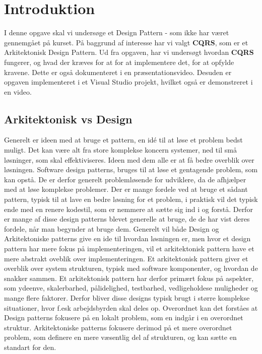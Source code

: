 \chapter{Introduktion}
I denne opgave skal vi undersøge et Design Pattern - som ikke har været gennemgået på kurset. 
På baggrund af interesse har vi valgt \textbf{CQRS}, som er et Arkitektonisk Design Pattern. Ud fra opgaven, har vi undersøgt hvordan \textbf{CQRS} fungerer, og hvad der kræves for at for at implementere det, for at opfylde kravene. Dette er også dokumenteret i en præsentationsvideo.
Desuden er opgaven implementeret i et Visual Studio projekt, hvilket også er demonstreret i en video.

\section{Arkitektonisk vs Design}
Generelt er ideen med at bruge et pattern, en idé til at løse et problem bedst muligt. Det kan være alt fra store komplekse koncern systemer, ned til små løsninger, som skal effektiviseres. Ideen med dem alle er at få bedre overblik over løsningen.
\newline
\newline
Software design patterns, bruges til at løse et gentagende problem, som kan opstå. De er derfor generelt problemløsende for udviklere, da de afhjælper med at løse komplekse problemer.
Der er mange fordele ved at bruge et sådant pattern, typisk til at lave en bedre løsning for et problem, i praktisk vil det typisk ende med en renere kodestil, som er nemmere at sætte sig ind i og forstå. Derfor er mange af disse design patterns blevet generelle at bruge, de de har vist deres fordele, når man begynder at bruge dem.
\newline
\newline
Generelt vil både Design og Arkitektoniske patterns give en ide til hvordan løsningen er, men hvor et design pattern har mere fokus på implementeringen, vil et arkitektonisk pattern have et mere abstrakt oveblik over implementeringen.
Et arkitektonisk pattern giver et overblik over system strukturen, typisk med software komponenter, og hvordan de snakker sammen. Et arkitektonisk pattern har derfor primært fokus på aspekter, som ydeenve, skalerbarhed, pålidelighed, testbarhed, vedligeholdese muligheder og mange flere faktorer. Derfor bliver disse designs typisk brugt i større komplekse situationer, hvor f.esk arbejdsbyrden skal deles op.
\newline
\newline
Overordnet kan det forståes at Design patterns fokusere på en lokalt problem, som en indgår i en overordnet struktur. Arkitektoniske patterns fokusere derimod på et mere overordnet problem, som definere en mere væsentlig del af strukturen, og kan sætte en standart for den.

